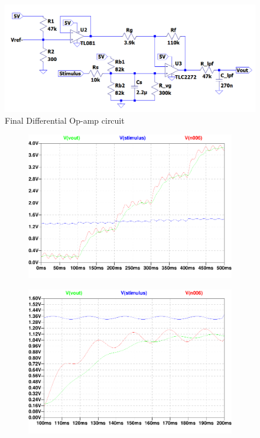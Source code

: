 \begin{figure}[H]
    \centering
    \includegraphics[width=\linewidth]{./Figures/Pictures/OPAMPFinal.png}
    \caption{Final Differential Op-amp circuit}
    \label{fig:opamp_final}
\end{figure}
\begin{figure}[H]
    \centering
    \begin{subfigure}[]{0.45\textwidth}
        \centering
  		\includegraphics[width=1\linewidth]{./Figures/pdf/OpAmpStepResponse.pdf}
		\caption{} \label{subfig:opampresp}
    \end{subfigure}
    \begin{subfigure}[]{0.45\textwidth}
        \centering
  		\includegraphics[width=1\linewidth]{./Figures/pdf/OpAmpStepResponse100ms.pdf}

\end{subfigure}
\end{figure}
